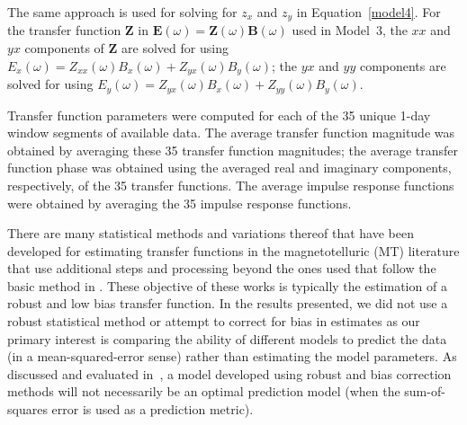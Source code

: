 \documentclass[draft,linenumbers]{agujournal2018}
\begin{document}
The same approach is used for solving for $z_x$ and $z_y$ in Equation~\ref{model4}. For the transfer function $\boldsymbol{Z}$ in $\mathbf{E}(\omega) = \boldsymbol{Z}(\omega)\mathbf{B}(\omega)$ used in Model~3, the $xx$ and $yx$ components of $\boldsymbol{Z}$ are solved for using $E_x(\omega) = Z_{xx}(\omega)B_x(\omega) + Z_{yx}(\omega)B_{y}(\omega)$; the $yx$ and $yy$ components are solved for using $E_y(\omega) = Z_{yx}(\omega)B_x(\omega) + Z_{yy}(\omega)B_y(\omega)$.



Transfer function parameters were computed for each of the 35 unique 1-day window segments of available data. The average transfer function magnitude was obtained by averaging these 35 transfer function magnitudes; the average transfer function phase was obtained using the averaged real and imaginary components, respectively, of the 35 transfer functions. The average impulse response functions were obtained by averaging the 35 impulse response functions. 

There are many statistical methods and variations thereof that have been developed for estimating transfer functions in the magnetotelluric (MT) literature that use additional steps and processing \citep{Egbert1986,Chave1987,Chave1989,Jones1989,Larsen1996,Egbert1997,Eisel2001,Chave2004,Chave2012,Chave2017} beyond the ones used that follow the basic method in \cite{Sims1971,Simpson2005}. These objective of these works is typically the estimation of a robust and low bias transfer function. In the results presented, we did not use a robust statistical method or attempt to correct for bias in estimates as our primary interest is comparing the ability of different models to predict the data (in a mean-squared-error sense) rather than estimating the model parameters. As discussed and evaluated in~\cite{Weigel2017}, a model developed using robust and bias correction methods will not necessarily be an optimal prediction model (when the sum-of-squares error is used as a prediction metric).
\end{document}
